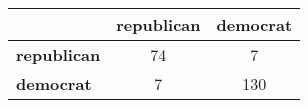 \begin{tabular}{l|cc}
\toprule
&\textbf{republican} & \textbf{democrat}\\
\midrule
\textbf{republican} & 74 & 7\\
\textbf{democrat} & 7 & 130\\
\bottomrule
\end{tabular}
